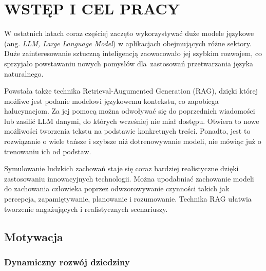 \chapter{WSTĘP I CEL PRACY}
\label{chap:introduction}


W ostatnich latach coraz częściej zaczęto wykorzystywać duże modele językowe (ang. \textit{LLM, Large Language Model}) w aplikacjach obejmujących różne sektory. Duże zainteresowanie sztuczną inteligencją zaowocowało jej szybkim rozwojem, co sprzyjało powstawaniu nowych pomysłów dla~zastosowań przetwarzania języka naturalnego.

Powstała także technika Retrieval-Augumented Generation (RAG), dzięki której możliwe jest podanie modelowi językowemu kontekstu, co zapobiega halucynacjom. Za jej pomocą można odwoływać się do poprzednich wiadomości lub zasilić LLM danymi, do których wcześniej nie miał dostępu. Otwiera to nowe możliwości tworzenia tekstu na podstawie konkretnych treści. Ponadto, jest to rozwiązanie o wiele tańsze i szybsze niż dotrenowywanie modeli, nie mówiąc już o trenowaniu ich od podstaw.

Symulowanie ludzkich zachowań staje się coraz bardziej realistyczne dzięki zastosowaniu innowacyjnych technologii. Można upodabniać zachowanie modeli do zachowania człowieka poprzez odwzorowywanie czynności takich jak percepcja, zapamiętywanie, planowanie i rozumowanie. Technika RAG ułatwia tworzenie angażujących i realistycznych scenariuszy.


\section{Motywacja}


\subsection{Dynamiczny rozwój dziedziny}


